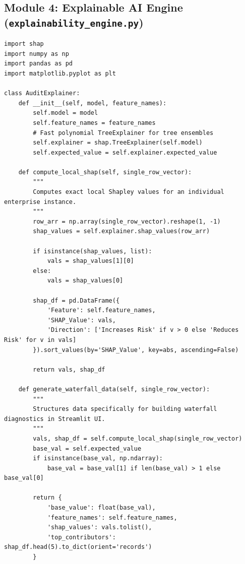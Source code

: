 \documentclass[11pt, a4paper]{article}
\begin{document}
\subsection{Module 4: Explainable AI Engine (\texttt{explainability\_engine.py})}
\begin{verbatim}
import shap
import numpy as np
import pandas as pd
import matplotlib.pyplot as plt

class AuditExplainer:
    def __init__(self, model, feature_names):
        self.model = model
        self.feature_names = feature_names
        # Fast polynomial TreeExplainer for tree ensembles
        self.explainer = shap.TreeExplainer(self.model)
        self.expected_value = self.explainer.expected_value
        
    def compute_local_shap(self, single_row_vector):
        """
        Computes exact local Shapley values for an individual enterprise instance.
        """
        row_arr = np.array(single_row_vector).reshape(1, -1)
        shap_values = self.explainer.shap_values(row_arr)
        
        if isinstance(shap_values, list):
            vals = shap_values[1][0]
        else:
            vals = shap_values[0]
            
        shap_df = pd.DataFrame({
            'Feature': self.feature_names,
            'SHAP_Value': vals,
            'Direction': ['Increases Risk' if v > 0 else 'Reduces Risk' for v in vals]
        }).sort_values(by='SHAP_Value', key=abs, ascending=False)
        
        return vals, shap_df
        
    def generate_waterfall_data(self, single_row_vector):
        """
        Structures data specifically for building waterfall diagnostics in Streamlit UI.
        """
        vals, shap_df = self.compute_local_shap(single_row_vector)
        base_val = self.expected_value
        if isinstance(base_val, np.ndarray):
            base_val = base_val[1] if len(base_val) > 1 else base_val[0]
            
        return {
            'base_value': float(base_val),
            'feature_names': self.feature_names,
            'shap_values': vals.tolist(),
            'top_contributors': shap_df.head(5).to_dict(orient='records')
        }
\end{verbatim}
\end{document}
